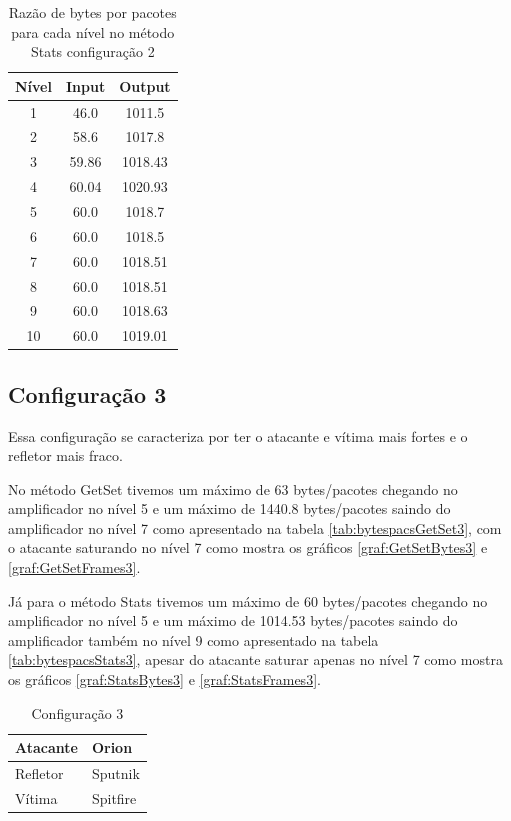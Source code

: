 \begin{table}[H]
\centering
\label{tab:bytespacsStats2}
\caption{Razão de bytes por pacotes para cada nível no método Stats configuração 2}
\begin{tabular}{|c|c|c|}
\hline
Nível & Input & Output  \\ \hline
1     & 46.0  & 1011.5  \\ \hline
2     & 58.6  & 1017.8  \\ \hline
3     & 59.86 & 1018.43 \\ \hline
4     & 60.04 & 1020.93 \\ \hline
5     & 60.0  & 1018.7  \\ \hline
6     & 60.0  & 1018.5  \\ \hline
7     & 60.0  & 1018.51 \\ \hline
8     & 60.0  & 1018.51 \\ \hline
9     & 60.0  & 1018.63 \\ \hline
10    & 60.0  & 1019.01 \\ \hline
\end{tabular}
\end{table}

\subsection*{Configuração 3}

Essa configuração se caracteriza por ter o atacante e vítima mais fortes e o refletor mais
fraco.

No método GetSet tivemos um máximo de 63 bytes/pacotes chegando no amplificador no nível 5 e um máximo de 1440.8 bytes/pacotes saindo do amplificador no nível 7 como apresentado na tabela \ref{tab:bytespacsGetSet3}, com o atacante saturando no nível 7 como mostra os gráficos \ref{graf:GetSetBytes3} e \ref{graf:GetSetFrames3}.

Já para o método Stats tivemos um máximo de 60 bytes/pacotes chegando no amplificador no nível 5 e um máximo de 1014.53 bytes/pacotes saindo do amplificador também no nível 9 como apresentado na tabela \ref{tab:bytespacsStats3}, apesar do atacante saturar apenas no nível 7 como mostra os gráficos \ref{graf:StatsBytes3} e \ref{graf:StatsFrames3}.

\begin{table}[H]
\centering
\caption{Configuração 3}
\begin{tabular}{|l|l|}
\hline
Atacante     & Orion    \\ \hline
Refletor     & Sputnik  \\ \hline
Vítima       & Spitfire \\ \hline
\end{tabular}
\end{table}

